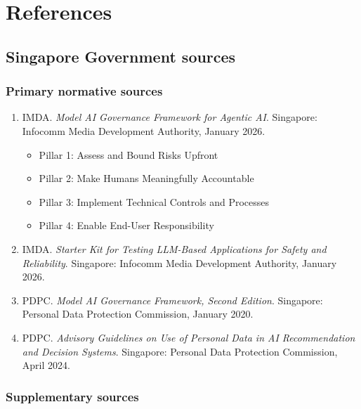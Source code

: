 \chapter{References}
\label{ch:references}

\section{Singapore Government sources}

\subsection{Primary normative sources}

\begin{enumerate}
  \item IMDA. \textit{Model AI Governance Framework for Agentic AI}.
        Singapore: Infocomm Media Development Authority, January 2026.
        
        \begin{itemize}
          \item Pillar 1: Assess and Bound Risks Upfront
          \item Pillar 2: Make Humans Meaningfully Accountable
          \item Pillar 3: Implement Technical Controls and Processes
          \item Pillar 4: Enable End-User Responsibility
        \end{itemize}
  
  \item IMDA. \textit{Starter Kit for Testing LLM-Based Applications for Safety
        and Reliability}. Singapore: Infocomm Media Development Authority,
        January 2026.
  
  \item PDPC. \textit{Model AI Governance Framework, Second Edition}.
        Singapore: Personal Data Protection Commission, January 2020.
  
  \item PDPC. \textit{Advisory Guidelines on Use of Personal Data in AI
        Recommendation and Decision Systems}. Singapore: Personal Data
        Protection Commission, April 2024.
\end{enumerate}

\subsection{Supplementary sources}

